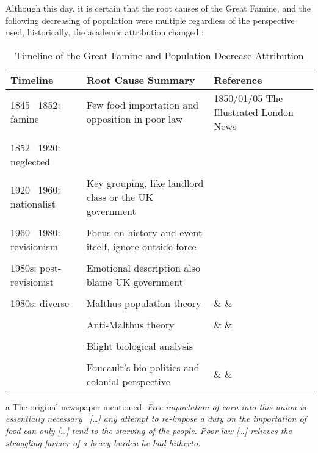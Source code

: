 Although this day, it is certain that the root causes of the Great Famine, and the following decreasing of population were multiple regardless of the perspective used, historically, the academic attribution changed \citep{henderson2005irish}:

\vspace{0pt}
\begin{table}[h]
    \centering
	\begin{threeparttable}
    \caption{Timeline of the Great Famine and Population Decrease Attribution}
		\begin{tabular}{lp{5cm}p{5cm}}
			\toprule
			Timeline & Root Cause Summary & Reference \\
			\midrule
			1845 \textendash\ 1852: famine & Few food importation and opposition in poor law & 1850/01/05 The Illustrated London News\tnote{a} \\
			& & \\
			1852 \textendash\ 1920: neglected  & \textemdash\ \tnote{b} & \citep{kinealy2017great}\\
			& & \\
			1920 \textendash\ 1960: nationalist & Key grouping, like landlord class or the UK government & \citep{smith2005reckoning} \\
			& & \\
			1960 \textendash\ 1980: revisionism & Focus on history and event itself, ignore outside force & \citep{daly2006revisionism} \\
			& & \\
			1980s: post-revisionist & Emotional description also blame UK government & \citep{hamera2011outline} \\
			& & \\
			1980s: diverse & Malthus population theory & \citep{o2009food} \& \citep{mcgregor1989demographic} \& \citep{weir1991malthus} \\
			& &  \\
			& Anti-Malthus theory & \citep{o1983malthus} \& \citep{mokyr1980malthusian} \& \citep{guinnane1994great}\\
			& & \\
			& Blight biological analysis & \citep{donnelly2011irish}\\
			& & \\
			& Foucault's bio-politics and colonial perspective & \citep{nally2008coming} \& \citep{kennedy2020beckett} \& \citep{madden2016aids} \\
			\bottomrule
		\end{tabular}
		\begin{tablenotes}
			\item[a] The original newspaper mentioned: \textit{Free importation of corn into this union is essentially necessary \textendash\ [\ldots] any attempt to re-impose a duty on the importation of food can only [\ldots]  tend to the starving of the people. Poor law [\ldots] relieves the struggling farmer of a heavy burden he had hitherto.} \citep{1850_01_05_news}
			

\end{tablenotes}
\end{threeparttable}
\end{table}
